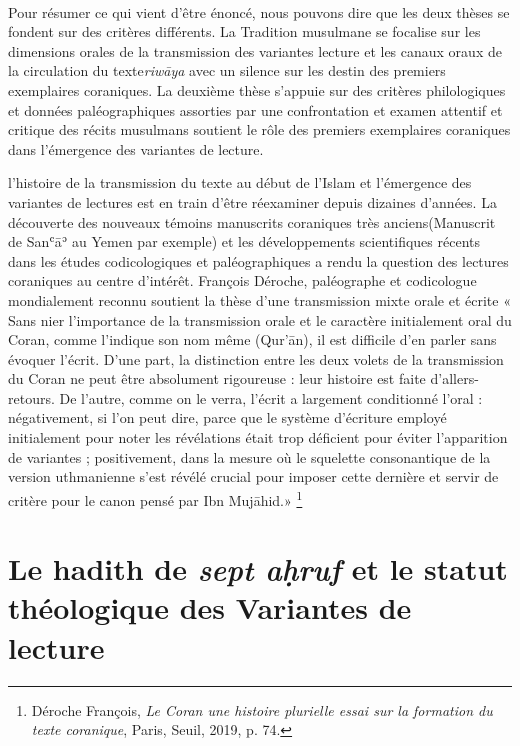 \documentclass[a4paper,12pt]{report}
\begin{document}
\begin{itemize}
\paragraph{}
Pour résumer ce qui vient d’être énoncé, nous pouvons dire que les deux thèses se fondent sur des critères différents. La Tradition musulmane se focalise sur les dimensions orales de la transmission des variantes lecture et les canaux oraux de la circulation du texte\textit{riwāya} avec un silence sur les destin des premiers exemplaires coraniques. La deuxième thèse  s’appuie sur des critères  philologiques et données  paléographiques assorties par une confrontation et examen attentif  et critique  des récits musulmans soutient le rôle des premiers exemplaires coraniques dans l'émergence des variantes de lecture.  

l'histoire de la transmission du texte au début de l'Islam et l'émergence des variantes de lectures est en train d'être réexaminer  depuis dizaines d'années. La découverte des nouveaux témoins manuscrits coraniques  très  anciens(Manuscrit de Sanʿāʾ au Yemen par exemple) et les développements scientifiques récents  dans les études codicologiques et paléographiques a rendu  la question des lectures coraniques au centre d'intérêt. François Déroche, paléographe et codicologue  mondialement reconnu soutient la thèse  d’une transmission mixte orale et écrite   « Sans nier l’importance de la transmission orale et le caractère initialement oral du Coran, comme l’indique son nom même (Qur’ān), il est difficile d’en parler sans évoquer l’écrit. D’une part, la distinction entre les deux volets de la transmission du Coran ne peut être absolument rigoureuse : leur histoire est faite d’allers-retours. De l’autre, comme on le verra, l’écrit a largement conditionné l’oral : négativement, si l’on peut dire, parce que le système d’écriture employé initialement pour noter les révélations était trop déficient pour éviter l’apparition de variantes ; positivement, dans la mesure où le squelette consonantique de la version uthmanienne s’est révélé crucial pour imposer cette dernière et servir de critère pour le canon pensé par Ibn Mujāhid.» \footnote{
Déroche François, \textit{Le Coran une histoire plurielle essai sur la formation du texte coranique}, Paris, Seuil, 2019, p. 74.
 }



\newpage

\section{	Le hadith de \textit{sept aḥruf} et le statut théologique des Variantes de lecture}




\end{itemize}
\end{document}
